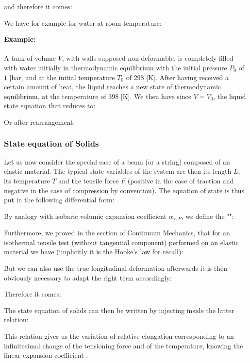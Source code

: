 	and therefore it comes:
	
	We have for example for water at room temperature:
	
	\begin{tcolorbox}[colframe=black,colback=white,sharp corners]
	\textbf{{\Large {}}Example:}\\\\
	A tank of volume $V$, with walls supposed non-deformable, is completely filled with water initially in thermodynamic equilibrium with the initial pressure $P_0$ of $1$ [bar] and at the initial temperature $T_0$ of $298$ [K]. After having received a certain amount of heat, the liquid reaches a new state of thermodynamic equilibrium, at the temperature of $398$ [K]. We then have since $V=V_0$, the liquid state equation that reduces to:
	
	Or after rearrangement:
	
	\end{tcolorbox}
	
	\subsubsection{State equation of Solids}
	Let us now consider the special case of a beam (or a string) composed of an elastic material. The typical state variables of the system are then its length $L$, its temperature $T$ and the tensile force $F$ (positive in the case of traction and negative in the case of compression by convention). The equation of state is thus put in the following differential form:
	
	By analogy with isobaric volumic expansion coefficient $\alpha_{V,P}$, we define the "":
	
	Furthermore, we proved in the section of Continuum Mechanics, that for an isothermal tensile test (without tangential component) performed on an elastic material we have (implicitly it is the Hooke's law for recall):
	
	But we can also use the true longitudinal deformation afterwards it is then obviously necessary to adapt the right term accordingly:
	
	Therefore it comes:
	
	The state equation of solids can then be written by injecting inside the latter relation:
	
	This relation gives us the variation of relative elongation corresponding to an infinitesimal change of the tensioning force and of the temperature, knowing the linear expansion coefficient .

